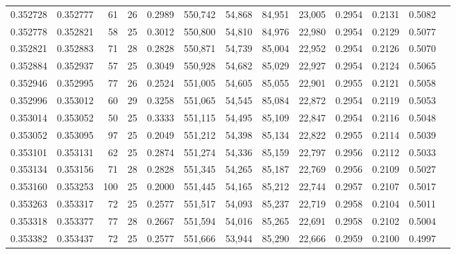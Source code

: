 \begin{tabular}{rrrrrrrrrrrrr}
0.352728 & 0.352777 &    61 &  26 &                                     0.2989 & 550,742 &  54,868 &  84,951 &  23,005 & 0.2954 & 0.2131 & 0.5082 \\
0.352778 & 0.352821 &    58 &  25 &                                     0.3012 & 550,800 &  54,810 &  84,976 &  22,980 & 0.2954 & 0.2129 & 0.5077 \\
0.352821 & 0.352883 &    71 &  28 &                                     0.2828 & 550,871 &  54,739 &  85,004 &  22,952 & 0.2954 & 0.2126 & 0.5070 \\
0.352884 & 0.352937 &    57 &  25 &                                     0.3049 & 550,928 &  54,682 &  85,029 &  22,927 & 0.2954 & 0.2124 & 0.5065 \\
0.352946 & 0.352995 &    77 &  26 &                                     0.2524 & 551,005 &  54,605 &  85,055 &  22,901 & 0.2955 & 0.2121 & 0.5058 \\
0.352996 & 0.353012 &    60 &  29 &                                     0.3258 & 551,065 &  54,545 &  85,084 &  22,872 & 0.2954 & 0.2119 & 0.5053 \\
0.353014 & 0.353052 &    50 &  25 &                                     0.3333 & 551,115 &  54,495 &  85,109 &  22,847 & 0.2954 & 0.2116 & 0.5048 \\
0.353052 & 0.353095 &    97 &  25 &                                     0.2049 & 551,212 &  54,398 &  85,134 &  22,822 & 0.2955 & 0.2114 & 0.5039 \\
0.353101 & 0.353131 &    62 &  25 &                                     0.2874 & 551,274 &  54,336 &  85,159 &  22,797 & 0.2956 & 0.2112 & 0.5033 \\
0.353134 & 0.353156 &    71 &  28 &                                     0.2828 & 551,345 &  54,265 &  85,187 &  22,769 & 0.2956 & 0.2109 & 0.5027 \\
0.353160 & 0.353253 &   100 &  25 &                                     0.2000 & 551,445 &  54,165 &  85,212 &  22,744 & 0.2957 & 0.2107 & 0.5017 \\
0.353263 & 0.353317 &    72 &  25 &                                     0.2577 & 551,517 &  54,093 &  85,237 &  22,719 & 0.2958 & 0.2104 & 0.5011 \\
0.353318 & 0.353377 &    77 &  28 &                                     0.2667 & 551,594 &  54,016 &  85,265 &  22,691 & 0.2958 & 0.2102 & 0.5004 \\
0.353382 & 0.353437 &    72 &  25 &                                     0.2577 & 551,666 &  53,944 &  85,290 &  22,666 & 0.2959 & 0.2100 & 0.4997 \\

\end{tabular}
